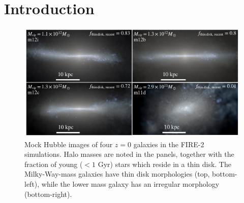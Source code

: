 \documentclass[fleqn,usenatbib]{mnras}
\begin{document}


\section{Introduction}
\label{s: introduction}

\begin{figure}
    \centering
    \includegraphics[width=\textwidth]{figures/stars.pdf}
    \caption{
    Mock Hubble images of four $z=0$ galaxies in the FIRE-2 simulations. Halo masses are noted in the panels, together with the fraction of young ($<1$ Gyr) stars which reside in a thin disk.  The Milky-Way-mass galaxies have thin disk morphologies (top, bottom-left), while the lower mass galaxy has an irregular morphology (bottom-right).
    }
    \label{f: stars}
\end{figure}
\end{document}
